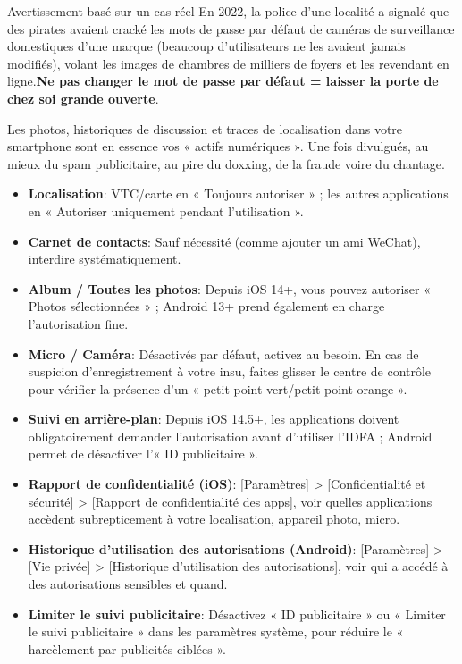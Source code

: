 \begin{tcbwarn}{Avertissement basé sur un cas réel}
En 2022, la police d'une localité a signalé que des pirates avaient cracké les mots de passe par défaut de caméras de surveillance domestiques d'une marque (beaucoup d'utilisateurs ne les avaient jamais modifiés), volant les images de chambres de milliers de foyers et les revendant en ligne.\textbf{Ne pas changer le mot de passe par défaut = laisser la porte de chez soi grande ouverte}.

\end{tcbwarn}


Les photos, historiques de discussion et traces de localisation dans votre smartphone sont en essence vos « actifs numériques ». Une fois divulgués, au mieux du spam publicitaire, au pire du doxxing, de la fraude voire du chantage.


\begin{itemize}
  \item \textbf{Localisation}: VTC/carte en « Toujours autoriser » ; les autres applications en « Autoriser uniquement pendant l'utilisation ».
  \item \textbf{Carnet de contacts}: Sauf nécessité (comme ajouter un ami WeChat), interdire systématiquement.
  \item \textbf{Album / Toutes les photos}: Depuis iOS 14+, vous pouvez autoriser « Photos sélectionnées » ; Android 13+ prend également en charge l'autorisation fine.
  \item \textbf{Micro / Caméra}: Désactivés par défaut, activez au besoin. En cas de suspicion d'enregistrement à votre insu, faites glisser le centre de contrôle pour vérifier la présence d'un « petit point vert/petit point orange ».
  \item \textbf{Suivi en arrière-plan}: Depuis iOS 14.5+, les applications doivent obligatoirement demander l'autorisation avant d'utiliser l'IDFA ; Android permet de désactiver l'« ID publicitaire ».
\end{itemize}


\begin{itemize}
  \item \textbf{Rapport de confidentialité (iOS)}: [Paramètres] > [Confidentialité et sécurité] > [Rapport de confidentialité des apps], voir quelles applications accèdent subrepticement à votre localisation, appareil photo, micro.
  \item \textbf{Historique d'utilisation des autorisations (Android)}: [Paramètres] > [Vie privée] > [Historique d'utilisation des autorisations], voir qui a accédé à des autorisations sensibles et quand.
  \item \textbf{Limiter le suivi publicitaire}: Désactivez « ID publicitaire » ou « Limiter le suivi publicitaire » dans les paramètres système, pour réduire le « harcèlement par publicités ciblées ».
\end{itemize}

